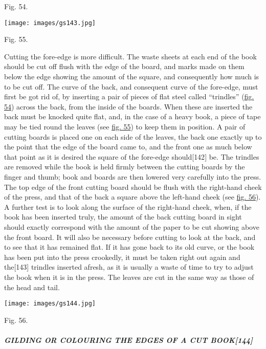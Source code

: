 \documentclass[
]{article}
\begin{document}
Fig. 54.

\protect\hypertarget{Fig_55}{}{}
\texttt{[image: images/gs143.jpg]}

Fig. 55.

Cutting the fore-edge is more difficult. The waste sheets at each end of
the book should be cut off flush with the edge of the board, and marks
made on them below the edge showing the amount of the square, and
consequently how much is to be cut off. The curve of the back, and
consequent curve of the fore-edge, must first be got rid of, by
inserting a pair of pieces of flat steel called ``trindles''
(\protect\hyperlink{Fig_54}{fig. 54}) across the back, from the inside
of the boards. When these are inserted the back must be knocked quite
flat, and, in the case of a heavy book, a piece of tape may be tied
round the leaves (see \protect\hyperlink{Fig_55}{fig. 55}) to keep them
in position. A pair of cutting boards is placed one on each side of the
leaves, the back one exactly up to the point that the edge of the board
came to, and the front one as much below that point as it is desired the
square of the fore-edge
should{\protect\hypertarget{Page_142}{}{{[}142{]}}} be. The trindles are
removed while the book is held firmly between the cutting boards by the
finger and thumb; book and boards are then lowered very carefully into
the press. The top edge of the front cutting board should be flush with
the right-hand cheek of the press, and that of the back a square above
the left-hand cheek (see \protect\hyperlink{Fig_56}{fig. 56}). A further
test is to look along the surface of the right-hand cheek, when, if the
book has been inserted truly, the amount of the back cutting board in
sight should exactly correspond with the amount of the paper to be cut
showing above the front board. It will also be necessary before cutting
to look at the back, and to see that it has remained flat. If it has
gone back to its old curve, or the book has been put into the press
crookedly, it must be taken right out again and
the{\protect\hypertarget{Page_143}{}{{[}143{]}}} trindles inserted
afresh, as it is usually a waste of time to try to adjust the book when
it is in the press. The leaves are cut in the same way as those of the
head and tail.

\protect\hypertarget{Fig_56}{}{}
\texttt{[image: images/gs144.jpg]}

Fig. 56.

\hypertarget{gilding-or-colouring-the-edges-of-a-cut-book144}{%
\subparagraph[GILDING OR COLOURING THE EDGES OF A CUT
BOOK]{\texorpdfstring{GILDING OR COLOURING THE EDGES OF A CUT
BOOK{\protect\hypertarget{Page_144}{}{{[}144{]}}}}{GILDING OR COLOURING THE EDGES OF A CUT BOOK{[}144{]}}}\label{gilding-or-colouring-the-edges-of-a-cut-book144}}
\end{document}
